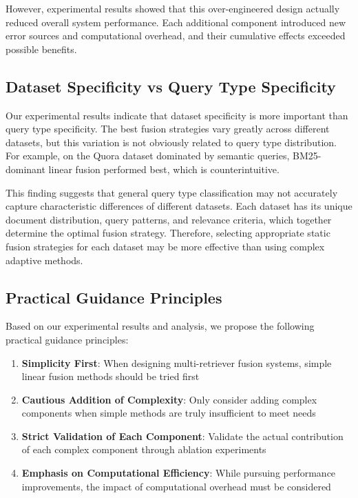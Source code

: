 \documentclass[letterpaper]{article} %
\begin{document}
However, experimental results showed that this over-engineered design actually reduced overall system performance. Each additional component introduced new error sources and computational overhead, and their cumulative effects exceeded possible benefits.

\subsection{Dataset Specificity vs Query Type Specificity}

Our experimental results indicate that dataset specificity is more important than query type specificity. The best fusion strategies vary greatly across different datasets, but this variation is not obviously related to query type distribution. For example, on the Quora dataset dominated by semantic queries, BM25-dominant linear fusion performed best, which is counterintuitive.

This finding suggests that general query type classification may not accurately capture characteristic differences of different datasets. Each dataset has its unique document distribution, query patterns, and relevance criteria, which together determine the optimal fusion strategy. Therefore, selecting appropriate static fusion strategies for each dataset may be more effective than using complex adaptive methods.

\subsection{Practical Guidance Principles}

Based on our experimental results and analysis, we propose the following practical guidance principles:

\begin{enumerate}
\item \textbf{Simplicity First}: When designing multi-retriever fusion systems, simple linear fusion methods should be tried first
\item \textbf{Cautious Addition of Complexity}: Only consider adding complex components when simple methods are truly insufficient to meet needs
\item \textbf{Strict Validation of Each Component}: Validate the actual contribution of each complex component through ablation experiments
\item \textbf{Emphasis on Computational Efficiency}: While pursuing performance improvements, the impact of computational overhead must be considered
\end{enumerate}
\end{document}
